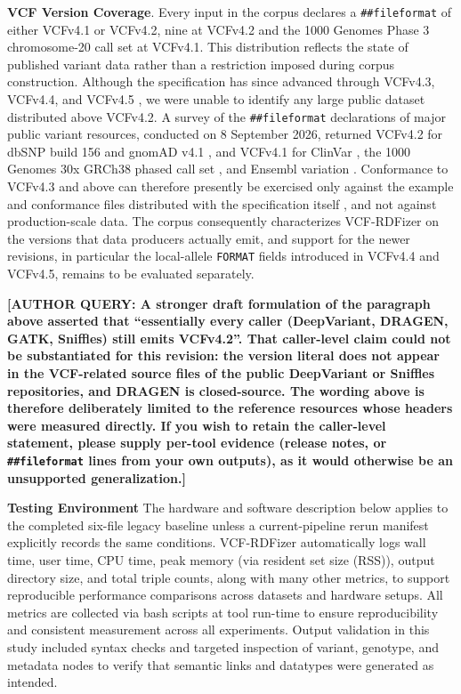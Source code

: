 \documentclass[pdflatex,sn-mathphys-num]{sn-jnl}%
\newenvironment{revision}{\begingroup\color{revisionblue}}{\endgroup}%
\newcommand{\authorquery}[1]{%
  \par\smallskip\noindent
  {\color{queryorange}\textbf{[AUTHOR QUERY: #1]}}%
  \par\smallskip
}%
\theoremstyle{thmstyleone}%
\theoremstyle{thmstyletwo}%
\theoremstyle{thmstylethree}%
\begin{document}
\begin{revision}
\textbf{VCF Version Coverage}.
Every input in the corpus declares a \texttt{\#\#fileformat} of either VCFv4.1 or VCFv4.2, nine at VCFv4.2 and the 1000 Genomes Phase 3 chromosome-20 call set at VCFv4.1.
This distribution reflects the state of published variant data rather than a restriction imposed during corpus construction.
Although the specification has since advanced through VCFv4.3, VCFv4.4, and VCFv4.5 \cite{vcf_spec_2024}, we were unable to identify any large public dataset distributed above VCFv4.2.
A survey of the \texttt{\#\#fileformat} declarations of major public variant resources, conducted on 8 September 2026, returned VCFv4.2 for dbSNP build 156 \cite{dbsnp_b156} and gnomAD v4.1 \cite{gnomad_v41}, and VCFv4.1 for ClinVar \cite{clinvar_vcf}, the 1000 Genomes 30x GRCh38 phased call set \cite{kgp_30x_grch38}, and Ensembl variation \cite{ensembl_variation}.
Conformance to VCFv4.3 and above can therefore presently be exercised only against the example and conformance files distributed with the specification itself \cite{vcf_spec_2024}, and not against production-scale data.
The corpus consequently characterizes VCF-RDFizer on the versions that data producers actually emit, and support for the newer revisions, in particular the local-allele \texttt{FORMAT} fields introduced in VCFv4.4 and VCFv4.5, remains to be evaluated separately.
\end{revision}
\authorquery{A stronger draft formulation of the paragraph above asserted that ``essentially every caller (DeepVariant, DRAGEN, GATK, Sniffles) still emits VCFv4.2''. That caller-level claim could not be substantiated for this revision: the version literal does not appear in the VCF-related source files of the public DeepVariant or Sniffles repositories, and DRAGEN is closed-source. The wording above is therefore deliberately limited to the reference resources whose headers were measured directly. If you wish to retain the caller-level statement, please supply per-tool evidence (release notes, or \texttt{\#\#fileformat} lines from your own outputs), as it would otherwise be an unsupported generalization.}

\textbf{Testing Environment}
\begin{revision}
The hardware and software description below applies to the completed six-file legacy baseline unless a current-pipeline rerun manifest explicitly records the same conditions.
\end{revision}
VCF-RDFizer automatically logs wall time, user time, CPU time, peak memory (via resident set size (RSS)), output directory size, and total triple counts, along with many other metrics, to support reproducible performance comparisons across datasets and hardware setups. 
All metrics are collected via bash scripts at tool run-time to ensure reproducibility and consistent measurement across all experiments. 
Output validation in this study included syntax checks and targeted inspection of variant, genotype, and metadata nodes to verify that semantic links and datatypes were generated as intended.
\end{document}
